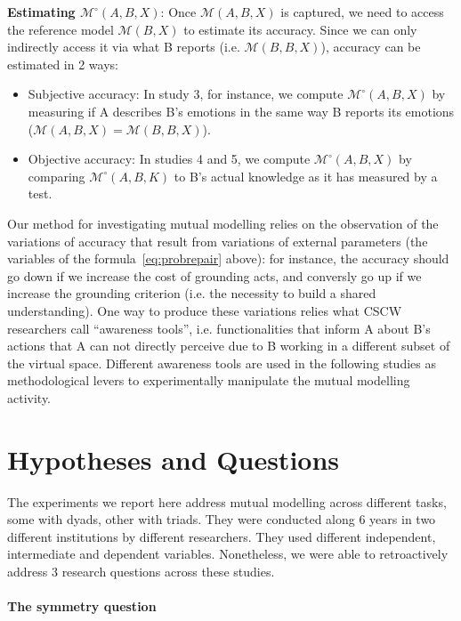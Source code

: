 \documentclass[natbib]{svjour3}
\newcommand{\ie}{i.e.\xspace}
\newcommand{\A}{A\xspace}
\newcommand{\B}{B\xspace}
\newcommand{\M}[3]{{\mathcal{M}(#1, #2, #3)}}
\newcommand{\model}[3]{{$\mathcal{M}(#1, #2, #3)$}}
\newcommand{\refmodel}[2]{{$\mathcal{M}(#1, #2)$}}
\newcommand{\Model}[3]{{$\mathcal{M}^{\circ}(#1, #2, #3)$}}
\begin{document}
{\bf Estimating \Model{A}{B}{X}}: Once \model{A}{B}{X} is captured, we need to
access the reference model \refmodel{B}{X} to estimate its accuracy.
Since we can only indirectly access it via what \B reports (\ie
\model{B}{B}{X}), accuracy can be estimated in 2 ways:

\begin{itemize}

    \item Subjective accuracy: In study 3, for instance, we compute \Model{A}{B}{X} by
        measuring if \A describes \B's emotions in the same way \B reports
        its emotions ($\M{A}{B}{X} = \M{B}{B}{X}$).

    \item Objective accuracy: In studies 4 and 5, we compute \Model{A}{B}{X} by
        comparing \Model{A}{B}{K} to \B's actual knowledge as it has measured
        by a test.

\end{itemize}

Our method for investigating mutual modelling relies on the observation of the variations of
accuracy that result from variations of external parameters (the variables of
the formula~\ref{eq:probrepair} above): for instance, the accuracy should
go down if we increase the cost of grounding acts, and conversly go up if we increase
the grounding criterion (\ie the necessity to build a shared understanding). One way
to produce these variations relies what CSCW researchers call ``awareness
tools'', \ie functionalities that inform \A about \B's actions that \A can
not directly perceive due to \B working in a different subset of the
virtual space. Different awareness tools are used in the following studies as
methodological levers to experimentally manipulate the mutual modelling
activity.


\section{Hypotheses and Questions}

The experiments we report here address mutual modelling across different tasks,
some with dyads, other with triads. They were conducted along 6 years in two
different institutions by different researchers. They used different
independent, intermediate and dependent variables. Nonetheless, we were able to
retroactively address 3 research questions across these studies. 

\paragraph{The symmetry question}
\end{document}
